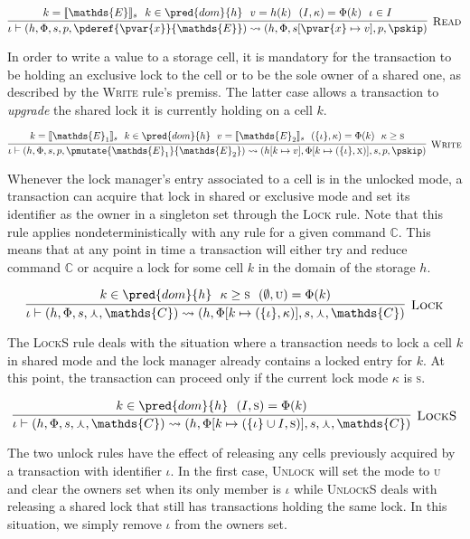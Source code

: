 \[
\infer[\textsc{Read}]
{
	\iota \vdash (h, \Phi, s, p, \pderef{\pvar{x}}{\mathds{E}})
	\rightsquigarrow
	(h, \Phi, s[\pvar{x} \mapsto v], p, \pskip)
}
{
	k = \llbracket \mathds{E} \rrbracket_s\ \
	k \in \pred{dom}{h}\ \
	v = h(k)\ \
	(I, \kappa) = \Phi(k)\ \
	\iota \in I
}
\]

In order to write a value to a storage cell, it is mandatory for the transaction to be holding an exclusive lock to the cell or to be the sole owner of a shared one, as described by the \textsc{Write} rule's premiss. The latter case allows a transaction to \textit{upgrade} the shared lock it is currently holding on a cell $k$.

\[
\infer[\textsc{Write}]
{
	\iota \vdash (h, \Phi, s, p, \pmutate{\mathds{E}_1}{\mathds{E}_2})
	\rightsquigarrow
	(h[k \mapsto v], \Phi[k \mapsto (\{\iota\}, \textsc{x})], s, p, \pskip)
}
{
	k = \llbracket \mathds{E}_1 \rrbracket_s\ \
	k \in \pred{dom}{h}\ \
	v = \llbracket \mathds{E}_2 \rrbracket_s\ \
	(\{ \iota \}, \kappa) = \Phi(k)\ \
	\kappa \geq \textsc{s}
}
\]

Whenever the lock manager's entry associated to a cell is in the unlocked mode, a transaction can acquire that lock in shared or exclusive mode and set its identifier as the owner in a singleton set through the \textsc{Lock} rule. Note that this rule applies nondeterministically with any rule for a given command $\mathds{C}$. This means that at any point in time a transaction will either try and reduce command $\mathds{C}$ or acquire a lock for some cell $k$ in the domain of the storage $h$.

\[
\infer[\textsc{Lock}]
{
	\iota \vdash (h, \Phi, s, \curlywedge, \mathds{C})
	\rightsquigarrow
	(h, \Phi[k \mapsto (\{\iota\}, \kappa)], s, \curlywedge, \mathds{C})
}
{
	k \in \pred{dom}{h}\ \
	\kappa \geq \textsc{s}\ \
	(\emptyset, \textsc{u}) = \Phi(k)
}
\]

The \textsc{LockS} rule deals with the situation where a transaction needs to lock a cell $k$ in shared mode and the lock manager already contains a locked entry for $k$. At this point, the transaction can proceed only if the current lock mode $\kappa$ is \textsc{s}.

\[
\infer[\textsc{LockS}]
{
	\iota \vdash (h, \Phi, s, \curlywedge, \mathds{C})
	\rightsquigarrow
	(h, \Phi[k \mapsto (\{\iota\} \cup I, \textsc{s})], s, \curlywedge, \mathds{C})
}
{
	k \in \pred{dom}{h}\ \
	(I, \textsc{s}) = \Phi(k)
}
\]

The two unlock rules have the effect of releasing any cells previously acquired by a transaction with identifier $\iota$. In the first case, \textsc{Unlock} will set the mode to \textsc{u} and clear the owners set when its only member is $\iota$ while \textsc{UnlockS} deals with releasing a shared lock that still has transactions holding the same lock. In this situation, we simply remove $\iota$ from the owners set.

